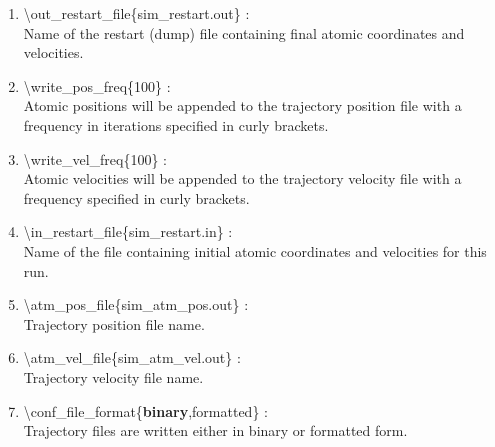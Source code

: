 \documentclass[12pt,titlepage]{article}
\begin{document}
\begin{enumerate}
\vspace{0.15in} 
 \item   \textbackslash out\_restart\_file\{sim\_restart.out\} : \\
   Name of the restart (dump) file containing final atomic 
          coordinates and velocities.


 \vspace{0.15in} 
 \item   \textbackslash write\_pos\_freq\{100\} : \\
    Atomic positions will be appended to the trajectory position file with
    a frequency in iterations specified in curly brackets.

 \vspace{0.15in} 
 \item   \textbackslash write\_vel\_freq\{100\} : \\
    Atomic velocities will be appended to the trajectory velocity file with
    a frequency specified in curly brackets.


 
 \vspace{0.15in} 
 \item   \textbackslash in\_restart\_file\{sim\_restart.in\} : \\
     Name of the file containing initial atomic coordinates and
     velocities for this run.


 \vspace{0.15in}
 \item   \textbackslash atm\_pos\_file\{sim\_atm\_pos.out\} : \\
     Trajectory position file name.

 \vspace{0.15in} 
 \item   \textbackslash atm\_vel\_file\{sim\_atm\_vel.out\} : \\
  Trajectory velocity file name.  


 
  
 
 \vspace{0.15in} 
 \item   \textbackslash conf\_file\_format\{{\bf binary},formatted\} : \\
   Trajectory files are written either in binary or formatted form.



\end{enumerate}
\end{document}
